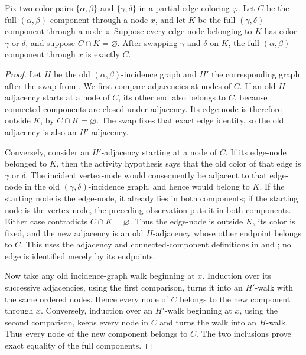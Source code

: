 \begin{helper}
Fix two color pairs $\{\alpha,\beta\}$ and $\{\gamma,\delta\}$ in a partial
edge coloring $\varphi$.  Let $C$ be the full $(\alpha,\beta)$-component
through a node $x$, and let $K$ be the full $(\gamma,\delta)$-component
through a node $z$.  Suppose every edge-node belonging to $K$ has color
$\gamma$ or $\delta$, and suppose $C\cap K=\varnothing$.  After swapping
$\gamma$ and $\delta$ on $K$, the full $(\alpha,\beta)$-component through
$x$ is exactly $C$.
\end{helper}
\begin{proof}
Let $H$ be the old $(\alpha,\beta)$-incidence graph and $H'$ the
corresponding graph after the swap from
.  We first compare adjacencies at nodes of
$C$.  If an old $H$-adjacency starts at a node of $C$, its other end
also belongs to $C$, because connected components are closed under
adjacency.  Its edge-node is therefore outside $K$, by
$C\cap K=\varnothing$.  The swap fixes that exact edge identity, so the old
adjacency is also an $H'$-adjacency.

Conversely, consider an $H'$-adjacency starting at a node of $C$.  If
its edge-node belonged to $K$, then the activity hypothesis says that the
old color of that edge is $\gamma$ or $\delta$.  The incident vertex-node
would consequently be adjacent to that edge-node in the old
$(\gamma,\delta)$-incidence graph, and hence would belong to $K$.  If the
starting node is the edge-node, it already lies in both components; if the
starting node is the vertex-node, the preceding observation puts it in both
components.  Either case contradicts $C\cap K=\varnothing$.  Thus the
edge-node is outside $K$, its color is fixed, and the new adjacency is an
old $H$-adjacency whose other endpoint belongs to $C$.  This uses the
adjacency and connected-component definitions in
 and ; no edge is
identified merely by its endpoints.

Now take any old incidence-graph walk beginning at $x$.  Induction over
its successive adjacencies, using the first comparison, turns it into an
$H'$-walk with the same ordered nodes.  Hence every node of $C$ belongs
to the new component through $x$.  Conversely, induction over an
$H'$-walk beginning at $x$, using the second comparison, keeps every
node in $C$ and turns the walk into an $H$-walk.  Thus every node of the
new component belongs to $C$.  The two inclusions prove exact equality of
the full components.
\end{proof}
